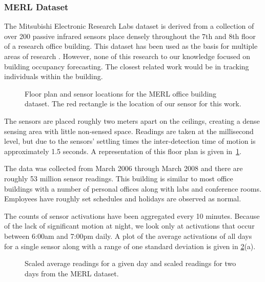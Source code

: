 \subsubsection{MERL Dataset} 
The Mitsubishi Electronic Research Labs dataset is derived from a collection of over 200 passive infrared sensors place densely throughout the 7th and 8th floor of a research office building.  This dataset has been used as the basis for multiple areas of research \cite{Wren2003, Wren2006, Wren2007a, Dong2011, Minnen2004, Wren2006a, Wren2007}.  However, none of this research to our knowledge focused on building occupancy forecasting.  The closest related work would be in tracking individuals within the building.

\begin{figure}[!ht]
	\begin{center}
	\end{center}
	\caption{Floor plan and sensor locations for the MERL office building dataset.  The red rectangle is the location of our sensor for this work.}
	\label{fig:merlfloor}
\end{figure}

The sensors are placed roughly two meters apart on the ceilings, creating a dense sensing area with little non-sensed space.  Readings are taken at the millisecond level, but due to the sensors' settling times the inter-detection time of motion is approximately 1.5 seconds.  A representation of this floor plan is given in~\ref{fig:merlfloor}.

The data was collected from March 2006 through March 2008 and there are roughly 53 million sensor readings.  This building is similar to most office buildings with a number of personal offices along with labs and conference rooms.  Employees have roughly set schedules and holidays are observed as normal. 

The counts of sensor activations have been aggregated every 10 minutes.  Because of the lack of significant motion at night, we look only at activations that occur between 6:00am and 7:00pm daily.  A plot of the average activations of all days for a single sensor along with a range of one standard deviation is given in \ref{fig:merl_scaled}(a).

\begin{figure}[!ht]
	\begin{center}
	\end{center}
	\caption{Scaled average readings for a given day and scaled readings for two days from the MERL dataset.}
	\label{fig:merl_scaled}
\end{figure}

